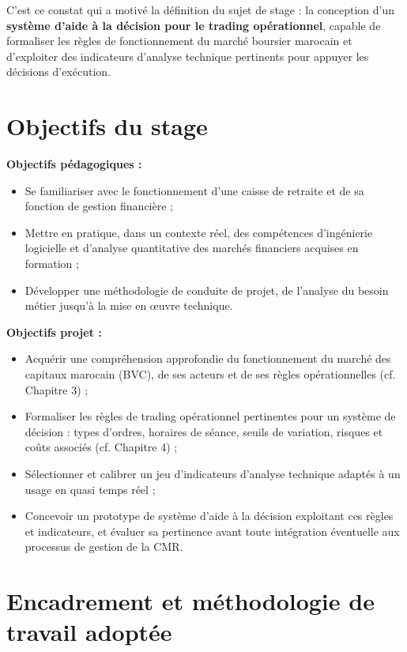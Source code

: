 \documentclass{rapportENSIAS} %
\begin{document}
\vspace{0.3cm}
\noindent
C'est ce constat qui a motivé la définition du sujet de stage : la conception d'un \textbf{système d'aide à la décision pour le trading opérationnel}, capable de formaliser les règles de fonctionnement du marché boursier marocain et d'exploiter des indicateurs d'analyse technique pertinents pour appuyer les décisions d'exécution.

\section{Objectifs du stage}

\noindent
\textbf{Objectifs pédagogiques :}\newline
\begin{itemize}
    \item Se familiariser avec le fonctionnement d'une caisse de retraite et de sa fonction de gestion financière ;
    \item Mettre en pratique, dans un contexte réel, des compétences d'ingénierie logicielle et d'analyse quantitative des marchés financiers acquises en formation ;
    \item Développer une méthodologie de conduite de projet, de l'analyse du besoin métier jusqu'à la mise en \oe uvre technique.\newline
\end{itemize}

\noindent
\textbf{Objectifs projet :}\newline
\begin{itemize}
    \item Acquérir une compréhension approfondie du fonctionnement du marché des capitaux marocain (BVC), de ses acteurs et de ses règles opérationnelles (cf. Chapitre 3) ;
    \item Formaliser les règles de trading opérationnel pertinentes pour un système de décision : types d'ordres, horaires de séance, seuils de variation, risques et coûts associés (cf. Chapitre 4) ;
    \item Sélectionner et calibrer un jeu d'indicateurs d'analyse technique adaptés à un usage en quasi temps réel ;
    \item Concevoir un prototype de système d'aide à la décision exploitant ces règles et indicateurs, et évaluer sa pertinence avant toute intégration éventuelle aux processus de gestion de la CMR.
\end{itemize}

\section{Encadrement et méthodologie de travail adoptée}
\end{document}
